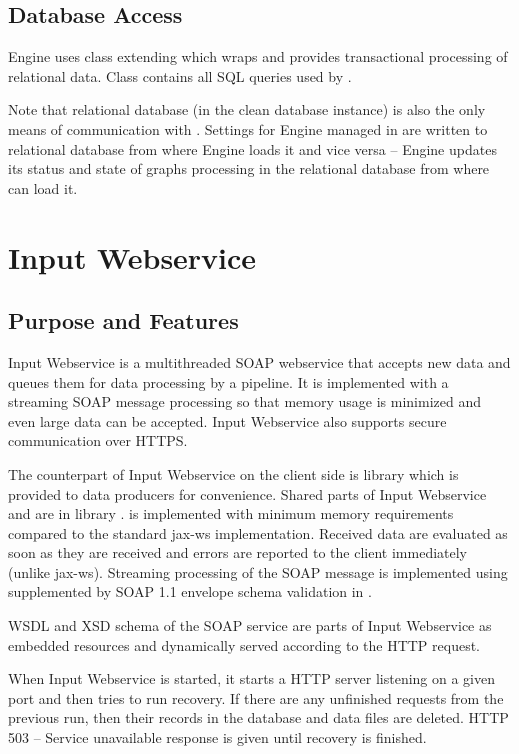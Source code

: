 \subsection{Database Access}
Engine uses class  extending 
which wraps  and provides transactional processing of relational data. 
Class  contains all SQL queries used by . 

Note that relational database (in the clean database instance) is also the only means of communication with \FE. Settings for Engine managed in \FE are written to relational database from where Engine loads it and vice versa -- Engine updates its status and state of graphs processing in the relational database from where \FE can load it.

\section{Input Webservice}
\subsection{Purpose and Features}
Input Webservice is a multithreaded SOAP webservice that accepts new data and queues them for data processing by a pipeline. It is implemented with a streaming SOAP message processing so that memory usage is minimized and even large data can be accepted. Input Webservice also supports secure communication over HTTPS. 

The counterpart of Input Webservice on the client side is  library which is provided to data producers for convenience. Shared parts of Input Webservice and  are in library .  is implemented with minimum memory requirements compared to the standard jax-ws implementation. Received data are evaluated as soon as they are received and errors are reported to the client immediately (unlike jax-ws). Streaming processing of the SOAP message is implemented using  supplemented by SOAP 1.1 envelope schema validation in . 

WSDL and XSD schema of the SOAP service are parts of Input Webservice as embedded resources and dynamically served according to the HTTP request.

When Input Webservice is started, it starts a HTTP server listening on a given port and then tries to run recovery. If there are any unfinished requests from the previous run, then their records in the database and data files are deleted. HTTP 503 -- Service unavailable response is given until recovery is finished.

